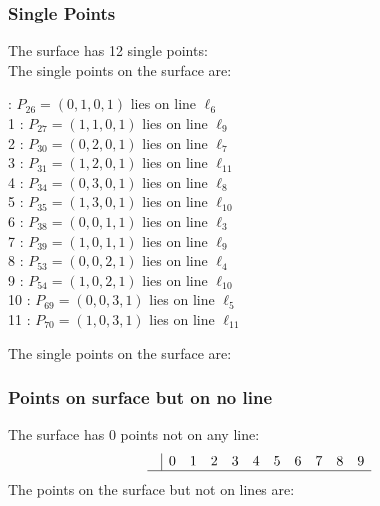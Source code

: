\documentclass{article}
\begin{document}
{\subsubsection*{Single Points}
The surface has 12 single points:\\
The single points on the surface are:\\
\begin{multicols}{2}
 : $P_{26}=( 0, 1, 0, 1 )$ lies on line $\ell_{6}$\\
1 : $P_{27}=( 1, 1, 0, 1 )$ lies on line $\ell_{9}$\\
2 : $P_{30}=( 0, 2, 0, 1 )$ lies on line $\ell_{7}$\\
3 : $P_{31}=( 1, 2, 0, 1 )$ lies on line $\ell_{11}$\\
4 : $P_{34}=( 0, 3, 0, 1 )$ lies on line $\ell_{8}$\\
5 : $P_{35}=( 1, 3, 0, 1 )$ lies on line $\ell_{10}$\\
6 : $P_{38}=( 0, 0, 1, 1 )$ lies on line $\ell_{3}$\\
7 : $P_{39}=( 1, 0, 1, 1 )$ lies on line $\ell_{9}$\\
8 : $P_{53}=( 0, 0, 2, 1 )$ lies on line $\ell_{4}$\\
9 : $P_{54}=( 1, 0, 2, 1 )$ lies on line $\ell_{10}$\\
10 : $P_{69}=( 0, 0, 3, 1 )$ lies on line $\ell_{5}$\\
11 : $P_{70}=( 1, 0, 3, 1 )$ lies on line $\ell_{11}$\\
\end{multicols}
The single points on the surface are:\\
\subsubsection*{Points on surface but on no line}
The surface has 0 points not on any line:\\
$$
\begin{array}{r|*{10}{r}}
 & 0 & 1 & 2 & 3 & 4 & 5 & 6 & 7 & 8 & 9\\
\hline
\end{array}
$$
The points on the surface but not on lines are:\\
\begin{multicols}{2}
\noindent
\end{multicols}
}
\end{document}
